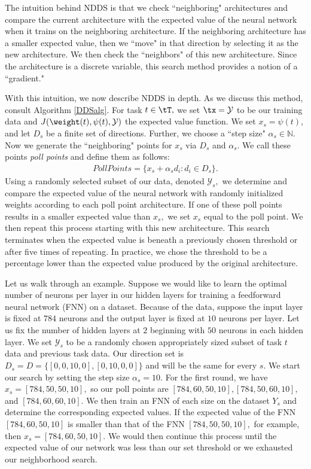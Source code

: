The intuition behind NDDS is that we check ``neighboring" architectures and compare the current architecture with the expected value of the neural network when it trains on the neighboring architecture. If the neighboring architecture has a smaller expected value,
then we ``move" in that direction by selecting it as the new architecture. We then check the ``neighbors" of this new architecture. Since the architecture is a discrete variable, this search method provides a notion of a ``gradient." 

With this intuition, we now describe NDDS in depth. As we discuss this method, consult Algorithm \ref{DDSalg}. For task $t\in \tT,$ we set $\tx = \mathcal{Y}$ to be our training data and $J(\weight(t),\psi(t), \mathcal{Y})$ the expected value function. We set $x_s = \psi(t)$, and let $D_s$ be a finite set of directions. Further, we choose a ``step size" $\alpha_s\in \mathbb{N}.$ Now we generate the ``neighboring" points for $x_s$ via $D_s$ and $\alpha_s.$ We call these points \textit{poll points} and define them as follows:
\begin{align*}
    Poll Points = \{x_s + \alpha_s d_i:d_i\in D_s\}.
\end{align*}
Using a randomly selected subset of our data, denoted $\mathcal{Y}_s,$ we determine and compare the expected value of the neural network with randomly initialized weights according to each poll point architecture. If one of these poll points results in a smaller expected value than $x_s,$ we set $x_s$ equal to the poll point. We then repeat this process starting with this new architecture. This search terminates when the expected value is beneath a previously chosen threshold or after five times of repeating. In practice, we chose the threshold to be a percentage lower than the expected value produced by the original architecture.

Let us walk through an example. Suppose we would like to learn the optimal number of neurons per layer in our hidden layers for training a feedforward neural network (FNN) on a dataset. Because of the data, suppose the input layer is fixed at $784$ neurons and the output layer is fixed at $10$ neurons per layer. Let us fix the number of hidden layers at $2$ beginning with $50$ neurons in each hidden layer. We set $\mathcal{Y}_s$  to be a randomly chosen appropriately sized subset of task $t$ data and previous task data. Our direction set is $D_s = D = \{[0,0,10,0],[0,10,0,0]\}$ and will be the same for every $s.$ We start our search by setting the step size $\alpha_s = 10.$ For the first round, we have $x_s = [784,50,50,10],$ so our poll points are $[784,60,50,10],[784,50,60,10],$ and $[784,60,60,10].$ We then train an FNN of each size on the dataset $Y_s$ and determine the corresponding expected values. If the expected value of the FNN $[784,60,50,10]$ is smaller than that of the FNN $[784,50,50,10],$ for example, then $x_s = [784,60,50,10].$ We would then continue this process until the expected value of our network was less than our set threshold or we exhausted our neighborhood search. 


